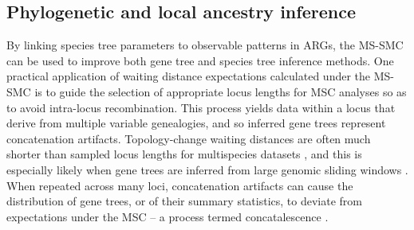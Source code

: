 \documentclass[11pt]{article}
\begin{document}

\subsection{Phylogenetic and local ancestry inference}

By linking species tree parameters to observable patterns in ARGs, the MS-SMC 
can be used to improve both gene tree and species tree inference methods. 
One practical application of waiting distance expectations 
calculated under the MS-SMC is to guide the selection of appropriate 
locus lengths for MSC analyses so as to avoid intra-locus recombination. 
This process yields data within a locus that derive from multiple variable genealogies, 
and so inferred gene trees represent concatenation artifacts.
Topology-change waiting distances are often much shorter
than sampled locus lengths for multispecies datasets \citep{mckenzie_multispecies_2020}, and this is 
especially likely when gene trees are inferred from large genomic sliding windows 
\citep[e.g.,][]{li2019recombination}. 
When repeated across many loci, concatenation artifacts can cause 
the distribution of gene trees, or of their summary statistics, to deviate 
from expectations under the MSC -- a process termed concatalescence 
\citep{gatesy_concatenation_2013}. 
\end{document}
